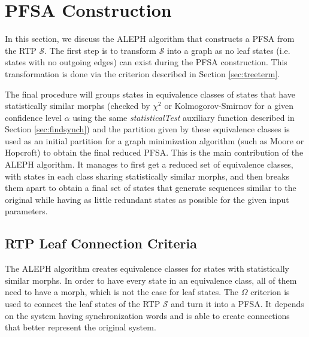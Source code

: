 {\newpage

\section{PFSA Construction \label{sec:pfsacons}}

In this section, we discuss the ALEPH algorithm that constructs a PFSA from the RTP $\mathcal{S}$. The first step is to transform $\mathcal{S}$ into a graph as no leaf states (i.e. states with no outgoing edges) can exist during the PFSA construction. This transformation is done via the criterion described in Section \ref{sec:treeterm}.

 The final procedure will groups states in equivalence classes of states that have statistically similar morphs (checked by $\chi^2$ or Kolmogorov-Smirnov for a given confidence level $\alpha$ using the same \textit{statisticalTest} auxiliary function described in Section \ref{sec:findsynch}) and the partition given by these equivalence classes is used as an initial partition for a graph minimization algorithm (such as Moore or Hopcroft) to obtain the final reduced PFSA. This is the main contribution of the ALEPH algorithm. It manages to first get a reduced set of equivalence classes, with states in each class sharing statistically similar morphs, and then breaks them apart to obtain a final set of states that generate sequences similar to the original while having as little redundant states as possible for the given input parameters.

\subsection{RTP Leaf Connection Criteria\label{sec:treeterm}}

The ALEPH algorithm creates equivalence classes for states with statistically similar morphs. In order to have every state in an equivalence class, all of them need to have a morph, which is not the case for leaf states. The $\Omega$ criterion is used to connect the leaf states of the RTP $\mathcal{S}$ and turn it into a PFSA. It depends on the system having synchronization words and is able to create connections that better represent the original system.

}
